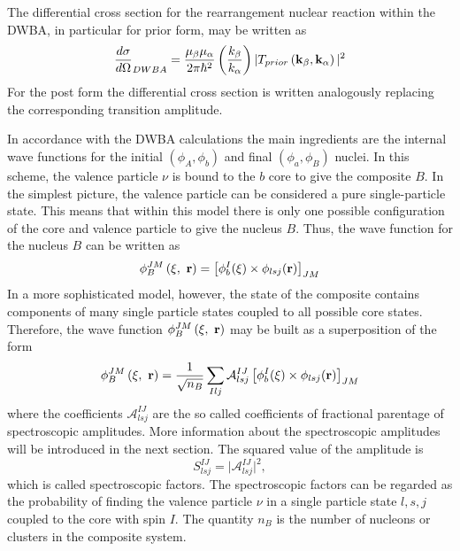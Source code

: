 \documentclass[
12pt, %
oneside, %
english, %
onehalfspacing, %
onehalfspacing, %
headsepline, %
]{MastersDoctoralThesis} %
\begin{document}
 The differential cross section for the rearrangement nuclear reaction within the DWBA, in particular for prior form, may be written as
 \begin{equation}
 \frac{d \sigma}{d \Omega}_{DWBA} = \frac{\mu_\beta \mu_\alpha}{2 \pi \hbar^2}
 \left( \frac{k_\beta}{k_\alpha}\right)
 \vert T_{prior} \left( {\bf k}_\beta, {\bf k}_\alpha \right) \vert^2
 \end{equation}
 For the post form the differential cross section is written analogously replacing the corresponding transition amplitude.
 
 In accordance with the DWBA calculations the main ingredients are the internal wave functions for the initial $\left( \phi_A, \phi_b \right)$ and final $\left( \phi_a, \phi_B \right)$ nuclei. 
 In this scheme, the valence particle $\nu$ is bound to the $b$ core to give the composite $B$.
In the simplest picture, the valence particle can be considered a pure single-particle state. 
This means that within this model there is only one possible configuration of the core and valence particle to give the nucleus $B$. Thus, the wave function for the nucleus $B$ can be written as
\begin{equation}
\phi^{JM}_B \left( \xi,~{\bf r} \right) = 
\left[ \phi_b^I (\xi)  \times \phi_{lsj} ({\bf r}) \right]_{JM}
\end{equation}
 In a more sophisticated model, however, the state of the composite contains components of many single particle states coupled to all possible core states.
 Therefore, the wave function $\phi^{JM}_B \left( \xi,~{\bf r} \right) $ may be built as a superposition of the form
 \begin{equation}
 \phi^{JM}_B \left( \xi,~{\bf r} \right)  =
 \frac{1}{\sqrt{n_B}}
 \sum_{Ilj} \mathcal{A}_{lsj}^{IJ} 
 \left[ \phi_b^I (\xi)  \times \phi_{lsj} ({\bf r}) \right]_{JM}
 \label{eq:composite_expansion}
 \end{equation}
 where the coefficients $\mathcal{A}_{lsj}^{IJ} $ are the so called coefficients of fractional parentage of spectroscopic amplitudes. 
 More information about the spectroscopic amplitudes will be introduced in the next section. 
  The squared value of the amplitude is
 \begin{equation}
 S^{IJ}_{lsj} = \vert \mathcal{A}_{lsj}^{IJ}  \vert^2,
 \end{equation}
 which is called spectroscopic factors. 
 The spectroscopic factors can be regarded as the probability of finding the valence particle $\nu$ in a single particle state $l, s, j$ coupled to the core with spin $I$.
 The quantity $n_B$ is the number of nucleons or clusters in the composite system. 
 
\end{document}
